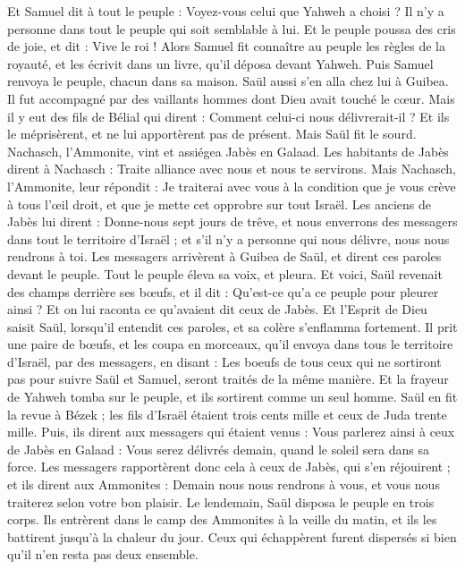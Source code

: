 \begin{multicols}{2}
Et Samuel dit à tout le peuple : Voyez-vous celui que Yahweh a choisi ? Il n'y a personne dans tout le peuple qui soit semblable à lui. Et le peuple poussa des cris de joie, et dit : Vive le roi !
Alors Samuel fit connaître au peuple les règles de la royauté, et les écrivit dans un livre, qu'il déposa devant Yahweh. Puis Samuel renvoya le peuple, chacun dans sa maison.
Saül aussi s'en alla chez lui à Guibea. Il fut accompagné par des vaillants hommes dont Dieu avait touché le cœur.
Mais il y eut des fils de Bélial qui dirent : Comment celui-ci nous délivrerait-il ? Et ils le méprisèrent, et ne lui apportèrent pas de présent. Mais Saül fit le sourd.
\VerseOne{}Nachasch, l'Ammonite, vint et assiégea Jabès en Galaad. Les habitants de Jabès dirent à Nachasch : Traite alliance avec nous et nous te servirons.
Mais Nachasch, l'Ammonite, leur répondit : Je traiterai avec vous à la condition que je vous crève à tous l'œil droit, et que je mette cet opprobre sur tout Israël.
Les anciens de Jabès lui dirent : Donne-nous sept jours de trêve, et nous enverrons des messagers dans tout le territoire d'Israël ; et s'il n'y a personne qui nous délivre, nous nous rendrons à toi.
Les messagers arrivèrent à Guibea de Saül, et dirent ces paroles devant le peuple. Tout le peuple éleva sa voix, et pleura.
Et voici, Saül revenait des champs derrière ses bœufs, et il dit : Qu'est-ce qu'a ce peuple pour pleurer ainsi ? Et on lui raconta ce qu'avaient dit ceux de Jabès.
Et l'Esprit de Dieu saisit Saül, lorsqu'il entendit ces paroles, et sa colère s'enflamma fortement.
Il prit une paire de bœufs, et les coupa en morceaux, qu'il envoya dans tous le territoire d'Israël, par des messagers, en disant : Les boeufs de tous ceux qui ne sortiront pas pour suivre Saül et Samuel, seront traités de la même manière. Et la frayeur de Yahweh tomba sur le peuple, et ils sortirent comme un seul homme.
Saül en fit la revue à Bézek ; les fils d'Israël étaient trois cents mille et ceux de Juda trente mille.
Puis, ils dirent aux messagers qui étaient venus : Vous parlerez ainsi à ceux de Jabès en Galaad : Vous serez délivrés demain, quand le soleil sera dans sa force. Les messagers rapportèrent donc cela à ceux de Jabès, qui s'en réjouirent ;
et ils dirent aux Ammonites : Demain nous nous rendrons à vous, et vous nous traiterez selon votre bon plaisir.
Le lendemain, Saül disposa le peuple en trois corps. Ils entrèrent dans le camp des Ammonites à la veille du matin, et ils les battirent jusqu'à la chaleur du jour. Ceux qui échappèrent furent dispersés si bien qu'il n'en resta pas deux ensemble.

\end{multicols}
